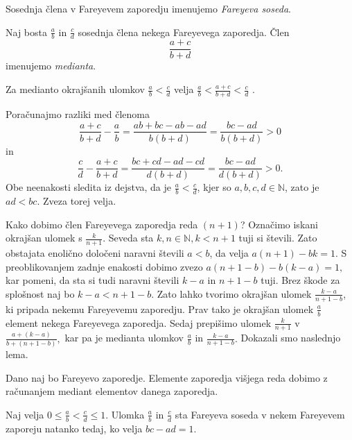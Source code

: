 \documentclass[mat1]{fmfdelo}
\begin{document}
\begin{definicija}
Sosednja člena v Fareyevem zaporedju imenujemo \emph{Fareyeva soseda}.
\end{definicija}

%
\begin{definicija}
Naj bosta $\frac{a}{b}$ in $\frac{c}{d}$ sosednja člena nekega Fareyevega zaporedja. Člen \[\frac{a+c}{b+d} \] imenujemo \emph{medianta}.
\end{definicija}

\begin{trditev}
Za medianto okrajšanih ulomkov \(\frac{a}{b} < \frac{c}{d}\) velja  \(\frac{a}{b} < \frac{a+c}{b+d} < \frac{c}{d}\) .
\end{trditev}

\begin{dokaz}
Poračunajmo razliki med členoma
\[\frac{a+c}{b+d} - \frac{a}{b} = \frac{ab+bc-ab-ad}{b(b+d)} = \frac{bc-ad}{b(b+d)} > 0\] in
\[\frac{c}{d} - \frac{a+c}{b+d} = \frac{bc+cd-ad-cd}{d(b+d)} = \frac{bc-ad}{d(b+d)} > 0.\]
Obe neenakosti sledita iz dejstva, da je \(\frac{a}{b} < \frac{c}{d}\), kjer so \(a, b, c, d \in \mathbb{N} \), zato je \( ad < bc.\)
Zveza torej velja. 
\end{dokaz}

%
Kako dobimo člen Fareyevega zaporedja reda $(n+1)$?
Označimo iskani okrajšan ulomek s $\frac{k}{n+1}$. Seveda sta $k, n \in\mathbb{N}, k < n+1$ tuji si števili. Zato obstajata enolično določeni naravni števili $a < b$, da velja $a(n+1)-bk=1.$ S preoblikovanjem zadnje enakosti dobimo zvezo $a(n+1-b)-b(k-a)=1,$ kar pomeni, da sta si tudi naravni števili $k-a$ in $n+1-b$ tuji. Brez škode za splošnost naj bo $k-a<n+1-b.$ Zato lahko tvorimo okrajšan ulomek $\frac{k-a}{n+1-b}$, ki pripada nekemu Fareyevemu zaporedju. Prav tako je okrajšan ulomek $\frac{a}{b}$ element nekega Fareyevega zaporedja. Sedaj prepišimo ulomek $\frac{k}{n+1}$ v $\frac{a+(k-a)}{b+(n+1-b)},$ kar pa je medianta ulomkov $\frac{a}{b}$ in $\frac{k-a}{n+1-b}.$ Dokazali smo naslednjo lema.

\begin{lema}
\label{lema:EltVišReda}
Dano naj bo Fareyevo zaporedje. Elemente zaporedja višjega reda dobimo z računanjem mediant elementov danega zaporedja.
\end{lema}

\begin{trditev}
Naj velja \( 0 \leq \frac{a}{b} < \frac{c}{d} \leq 1\). Ulomka $\frac{a}{b}$ in $\frac{c}{d}$ sta Fareyeva soseda v nekem Fareyevem zaporeju natanko tedaj, ko velja \(bc - ad = 1\).
\end{trditev}
\end{document}
